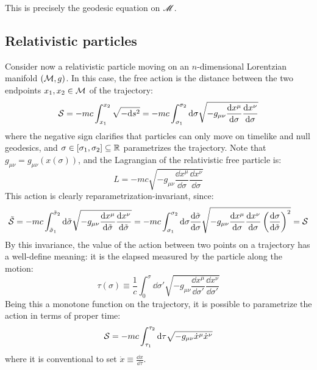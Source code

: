 This is precisely the geodesic equation on $ \mathscr{M} $.

\subsection{Relativistic particles}

Consider now a relativistic particle moving on an $ n $-dimensional Lorentzian manifold $ (\mathcal{M},g) $. In this case, the free action is the distance between the two endpoints $ x_1 , x_2 \in \mathcal{M} $ of the trajectory:
\begin{equation}
  \mathcal{S} = - m c \int_{x_1}^{x_2} \sqrt{- \mathrm{d} s^2} = - m c \int_{\sigma_1}^{\sigma_2} \mathrm{d} \sigma \sqrt{- g_{\mu \nu} \frac{\mathrm{d} x^\mu}{\mathrm{d} \sigma} \frac{\mathrm{d} x^\nu}{\mathrm{d} \sigma}}
  \label{eq:rel-act}
\end{equation}
where the negative sign clarifies that particles can only move on timelike and null geodesics, and $ \sigma \in [\sigma_1 , \sigma_2] \subseteq \mathbb{R} $ parametrizes the trajectory. Note that $ g_{\mu \nu} = g_{\mu \nu}(x(\sigma)) $, and the Lagrangian of the relativistic free particle is:
\begin{equation}
  L = - m c \sqrt{- g_{\mu \nu} \frac{\dd x^\mu}{\dd \sigma} \frac{\dd x^\nu}{\dd \sigma}}
  \label{eq:rel-lag}
\end{equation}
This action is clearly reparametrization-invariant, since:
\begin{equation*}
  \tilde{\mathcal{S}} = - m c \int_{\tilde{\sigma}_1}^{\tilde{\sigma}_2} \mathrm{d} \tilde{\sigma} \sqrt{- g_{\mu \nu} \frac{\mathrm{d} x^{\mu}}{\mathrm{d} \tilde{\sigma}} \frac{\mathrm{d} x^{\nu}}{\mathrm{d} \tilde{\sigma}}} = - m c \int_{\sigma_1}^{\sigma_2} \mathrm{d} \sigma \frac{\mathrm{d} \tilde{\sigma}}{\mathrm{d} \sigma} \sqrt{- g_{\mu \nu} \frac{\mathrm{d} x^{\mu}}{\mathrm{d} \sigma} \frac{\mathrm{d} x^{\nu}}{\mathrm{d} \sigma} \left( \frac{\mathrm{d} \sigma}{\mathrm{d} \tilde{\sigma}} \right)^2} = \mathcal{S}
\end{equation*}
By this invariance, the value of the action between two points on a trajectory has a well-define meaning: it is the elapsed  measured by the particle along the motion:
\begin{equation}
  \tau(\sigma) \equiv \frac{1}{c} \int_0^\sigma \dd \sigma' \sqrt{- g_{\mu \nu} \frac{\dd x^\mu}{\dd \sigma'} \frac{\dd x^\nu}{\dd \sigma'}}
  \label{eq:proper-time}
\end{equation}
Being this a monotone function on the trajectory, it is possible to parametrize the action in terms of proper time:
\begin{equation}
  \mathcal{S} = - m c \int_{\tau_1}^{\tau_2} \mathrm{d} \tau \sqrt{- g_{\mu \nu} \dot{x}^\mu \dot{x}^\nu}
\end{equation}
where it is conventional to set $ \dot{x} \equiv \frac{\dd x}{\dd \tau} $.

